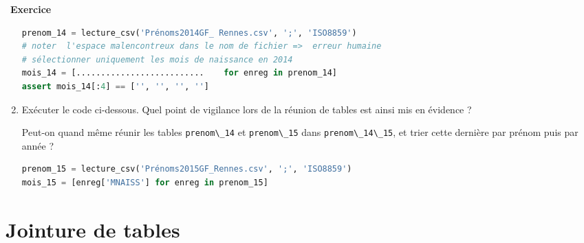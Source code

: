 \documentclass[
  11pt,
]{article}
\newcommand{\passthrough}[1]{#1}
\newcounter{exo}
\newenvironment{exercice}[1]
{\par \medskip   \addtocounter{exo}{1} \noindent  
\begin{bclogo}[arrondi =0.1,   noborder = true, logo=\bccrayon, marge=4]{~\textbf{Exercice} \textbf{\theexo} {\itshape #1} }  \par}
{
\end{bclogo}
 \par \bigskip }
\begin{document}
\begin{exercice}{}
\begin{enumerate}
\begin{lstlisting}[language=Python]
prenom_14 = lecture_csv('Prénoms2014GF_ Rennes.csv', ';', 'ISO8859')
# noter  l'espace malencontreux dans le nom de fichier =>  erreur humaine
# sélectionner uniquement les mois de naissance en 2014
mois_14 = [..........................    for enreg in prenom_14]
assert mois_14[:4] == ['', '', '', '']
\end{lstlisting}
\item
  Exécuter le code ci-dessous. Quel point de vigilance lors de la
  réunion de tables est ainsi mis en évidence ?

  Peut-on quand même réunir les tables
  \passthrough{\lstinline!prenom\_14!} et
  \passthrough{\lstinline!prenom\_15!} dans
  \passthrough{\lstinline!prenom\_14\_15!}, et trier cette dernière par
  prénom puis par année ?

\begin{lstlisting}[language=Python]
prenom_15 = lecture_csv('Prénoms2015GF_Rennes.csv', ';', 'ISO8859')
mois_15 = [enreg['MNAISS'] for enreg in prenom_15]
\end{lstlisting}
\end{enumerate}

\end{exercice}

\hypertarget{jointure-de-tables}{%
\section{Jointure de tables}\label{jointure-de-tables}}
\end{document}
